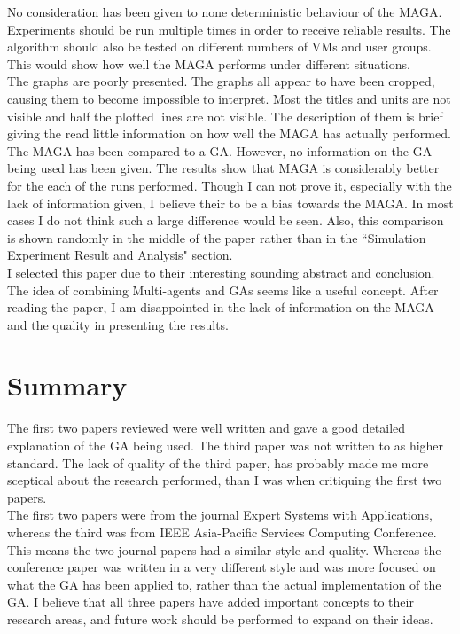 \documentclass[10pt,a4paper,openbib]{article}
\begin{document}
\begin{multicols}{2}
\noindent No consideration has been given to none deterministic behaviour of the MAGA. Experiments should be run multiple times in order to receive reliable results. The algorithm should also be tested on different numbers of VMs and user groups. This would show how well the MAGA performs under different situations.\\

\noindent The graphs are poorly presented. The graphs all appear to have been cropped, causing them to become impossible to interpret. Most the titles and units are not visible and half the plotted lines are not visible. The description of them is brief giving the read little information on how well the MAGA has actually performed.\\

\noindent The MAGA has been compared to a GA. However, no information on the GA being used has been given.  The results show that MAGA is considerably better for the each of the runs performed. Though I can not prove it, especially with the lack of information given, I believe their to be a bias towards the MAGA. In most cases I do not think such a large difference would be seen. Also, this comparison is shown randomly in the middle of the paper rather than in the ``Simulation Experiment Result and Analysis" section. \\

\noindent I selected this paper due to their interesting sounding abstract and conclusion. The idea of combining Multi-agents and GAs seems like a useful concept. After reading the paper, I am disappointed in the lack of information on the MAGA and the quality in presenting the results. 

\section{Summary}
The first two papers reviewed were well written and gave a good detailed explanation of the GA being used. The third paper was not written to as higher standard. The lack of quality of the third paper, has probably made me more sceptical about the research performed, than I was when critiquing the first two papers. \\

\noindent The first two papers were from the journal Expert Systems with Applications, whereas the third was from IEEE Asia-Pacific Services Computing Conference. This means the two journal papers had a similar style and quality. Whereas the conference paper was written in a very different style and was more focused on what the GA has been applied to, rather than the actual implementation of the GA. I believe that all three papers have added important concepts to their research areas, and future work should be performed to expand on their ideas. 

\end{multicols}
\nocite{*}


\end{document}
